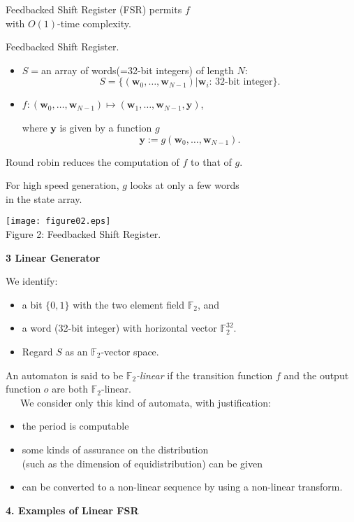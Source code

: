 \documentclass[a4j,12pt,landscape]{jarticle}
\def\F2{{\mathbb F}_2}
\def\by{{{\mathbf y}}}
\def\bw{{{\mathbf w}}}
\begin{document}
{\vskip 5mm
Feedbacked Shift Register (FSR) permits $f$ \\
with $O(1)$-time complexity.

\newpage
Feedbacked Shift Register.
\begin{itemize}
\item
$S=$an array of words(=32-bit integers) of length $N$:
$$
S = \{(\bw_0,\ldots,\bw_{N-1})| \bw_i \mbox{: 32-bit integer}\}.
$$
\item
$f:(\bw_0,\ldots,\bw_{N-1}) \mapsto (\bw_1,\ldots,\bw_{N-1}, \by)$,

where $\by$ is given by a function $g$
$$\by:=g(\bw_0,\ldots,\bw_{N-1}).$$
\end{itemize}

Round robin reduces the computation of $f$ to that of $g$. 

For high speed generation, $g$ looks at only a few words \\
in the state array.
\newpage

\begin{center}
\texttt{[image: figure02.eps]}
\\
Figure 2: Feedbacked Shift Register.
\\
\end{center}
\newpage
\noindent
{\bf 3 Linear Generator}

We identify: 
\begin{itemize}
\item 
a bit $\{0,1\}$ with the two element field $\F2$, and
\item 
a word (32-bit integer) with horizontal vector $\F2^{32}$.
\item 
Regard $S$ as an $\F2$-vector space.
\end{itemize}
An automaton is said to be {\em $\F2$-linear} if 
the transition function $f$ and 
the output function $o$ are both $\F2$-linear. \\
~~~We consider only this kind of automata, with 
justification:
\begin{itemize}
\item the period is computable
\item some kinds of assurance on the distribution \\
(such as the dimension of equidistribution) can be given
\item can be converted to a non-linear sequence 
by using a non-linear transform. 
\end{itemize}

\newpage
\noindent
{\bf 4. Examples of Linear FSR}

}
\end{document}
